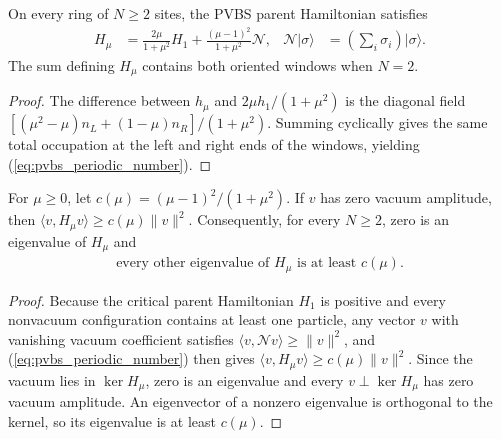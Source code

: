 \begin{lemma}
    \label{thm:pvbs_periodic_occupation}
    \leanok
    On every ring of $N\ge2$ sites, the PVBS parent Hamiltonian satisfies
    \begin{align}
        H_\mu & =\frac{2\mu}{1+\mu^2}H_1+
        \frac{(\mu-1)^2}{1+\mu^2}\mathcal N,
              & \mathcal N|\sigma\rangle  & =
        \left(\sum_i\sigma_i\right)|\sigma\rangle.
        \label{eq:pvbs_periodic_number}
    \end{align}
    The sum defining $H_\mu$ contains both oriented windows when $N=2$.
\end{lemma}
\begin{proof}
    \leanok
    The difference between $h_\mu$ and $2\mu h_1/(1+\mu^2)$ is the
    diagonal field $[(\mu^2-\mu)n_L+(1-\mu)n_R]/(1+\mu^2)$.
    Summing cyclically gives the same total occupation at the left and
    right ends of the windows, yielding (\ref{eq:pvbs_periodic_number}).
\end{proof}

\begin{lemma}
    \label{thm:pvbs_uniform_lower_gap}
    \leanok
    For $\mu\ge0$, let $c(\mu)=(\mu-1)^2/(1+\mu^2)$.
    If $v$ has zero vacuum amplitude, then
    $\langle v,H_\mu v\rangle\ge c(\mu)\|v\|^2$.
    Consequently, for every $N\ge2$, zero is an eigenvalue of $H_\mu$ and
    \begin{align}
        \text{every other eigenvalue of }H_\mu\text{ is at least }c(\mu).
        \label{eq:pvbs_uniform_norm_gap}
    \end{align}
\end{lemma}
\begin{proof}
    \leanok
    Because the critical parent Hamiltonian $H_1$ is positive and every
    nonvacuum configuration contains at least one particle, any vector $v$
    with vanishing vacuum coefficient satisfies
    $\langle v,\mathcal N v\rangle\ge\|v\|^2$, and
    (\ref{eq:pvbs_periodic_number}) then gives
    $\langle v,H_\mu v\rangle\ge c(\mu)\|v\|^2$. Since the vacuum lies in
    $\ker H_\mu$, zero is an eigenvalue and every $v\perp\ker H_\mu$ has zero
    vacuum amplitude. An eigenvector of a nonzero eigenvalue is orthogonal to
    the kernel, so its eigenvalue is at least $c(\mu)$.
\end{proof}

